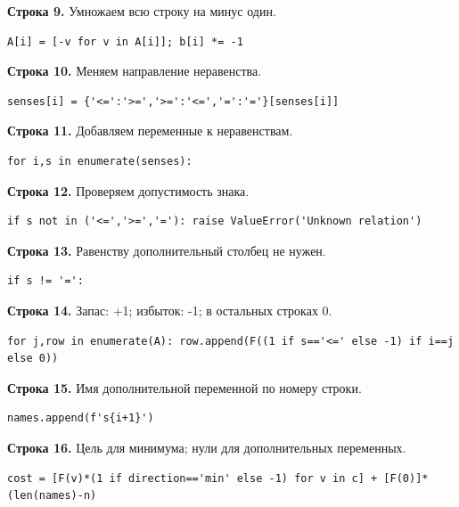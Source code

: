 \documentclass[12pt,a4paper]{article}
\begin{document}
\par\textbf{Строка 9.} Умножаем всю строку на минус один.
\begin{Verbatim}[fontsize=\small,breaklines=true,breakanywhere=true]
            A[i] = [-v for v in A[i]]; b[i] *= -1
\end{Verbatim}
\par\textbf{Строка 10.} Меняем направление неравенства.
\begin{Verbatim}[fontsize=\small,breaklines=true,breakanywhere=true]
            senses[i] = {'<=':'>=','>=':'<=','=':'='}[senses[i]]
\end{Verbatim}
\par\textbf{Строка 11.} Добавляем переменные к неравенствам.
\begin{Verbatim}[fontsize=\small,breaklines=true,breakanywhere=true]
    for i,s in enumerate(senses):
\end{Verbatim}
\par\textbf{Строка 12.} Проверяем допустимость знака.
\begin{Verbatim}[fontsize=\small,breaklines=true,breakanywhere=true]
        if s not in ('<=','>=','='): raise ValueError('Unknown relation')
\end{Verbatim}
\par\textbf{Строка 13.} Равенству дополнительный столбец не нужен.
\begin{Verbatim}[fontsize=\small,breaklines=true,breakanywhere=true]
        if s != '=':
\end{Verbatim}
\par\textbf{Строка 14.} Запас: +1; избыток: -1; в остальных строках 0.
\begin{Verbatim}[fontsize=\small,breaklines=true,breakanywhere=true]
            for j,row in enumerate(A): row.append(F((1 if s=='<=' else -1) if i==j else 0))
\end{Verbatim}
\par\textbf{Строка 15.} Имя дополнительной переменной по номеру строки.
\begin{Verbatim}[fontsize=\small,breaklines=true,breakanywhere=true]
            names.append(f's{i+1}')
\end{Verbatim}
\par\textbf{Строка 16.} Цель для минимума; нули для дополнительных переменных.
\begin{Verbatim}[fontsize=\small,breaklines=true,breakanywhere=true]
    cost = [F(v)*(1 if direction=='min' else -1) for v in c] + [F(0)]*(len(names)-n)
\end{Verbatim}
\end{document}

